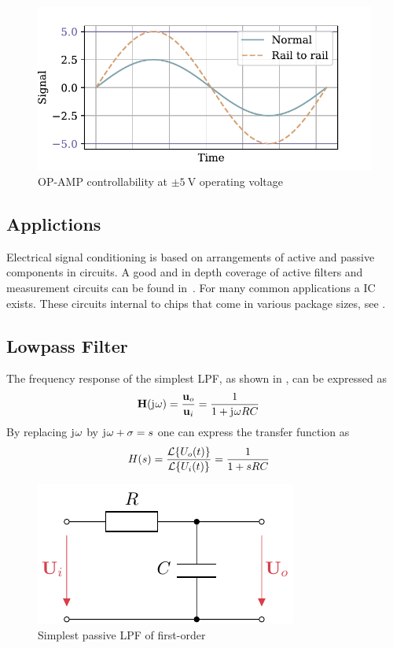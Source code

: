 \begin{figure}[htb!]
  \centering
  \includegraphics[scale=0.72]{figures/electronics/op_amp/plot_opamp_railrail}
  \caption[OP-AMP controllability]{OP-AMP controllability at $\pm\SI{5}{\volt}$ operating voltage%
    \label{fig:plot_opamp_railrail}}
\end{figure}

\subsection{Applictions}
Electrical signal conditioning is based on arrangements of active and passive components in circuits. A good and in depth coverage of active filters and measurement circuits can be found in~\cite{Tietze2008EC}. For many common applications a \acf{IC} exists. These circuits internal to chips that come in various package sizes, see .

\subsection{Lowpass Filter%
  \cite{Tietze2008EC}}

The frequency response of the simplest \ac{LPF}, as shown in , can be expressed as
\begin{align}
  \mathbf{H}(\mathrm{j}\mkern1mu\omega) &= \frac{\mathbf{u}_o}{\mathbf{u}_i} = \frac{1}{1+\mathrm{j}\mkern1mu\omega RC}
\end{align}
By replacing $\mathrm{j}\mkern1mu\omega$ by $\mathrm{j}\mkern1mu\omega+\sigma = s$ one can express the transfer function as
\begin{align}
  H(s) &= \frac{\mathcal{L}\{U_o(t)\}}{\mathcal{L}\{U_i(t)\}} = \frac{1}{1 + sRC}
\end{align}

\begin{figure}[htb!]
  \centering
  \includegraphics[scale=1]{figures/electronics/lowpass/lp_passive_1ord/lp_passive_1ord}
  \caption[Passive first-order \ac{LPF}]{Simplest passive \ac{LPF} of first-order%
    \label{fig:lp_passive_1ord}}
\end{figure}

